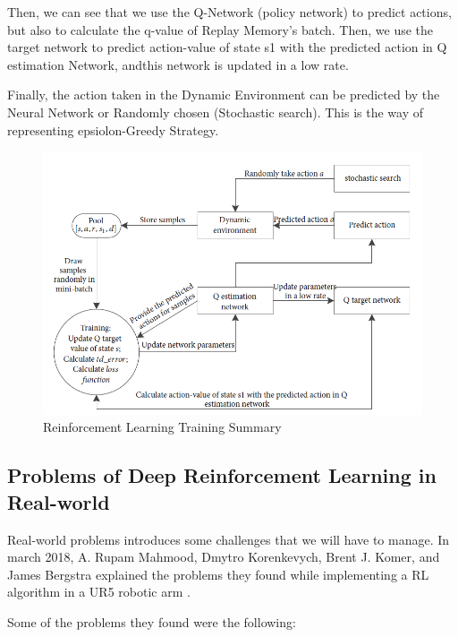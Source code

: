 			Then, we can see that we use the Q-Network (policy network) to predict actions, but also to calculate the q-value of Replay Memory's batch. Then, we use the target network to predict action-value of state s1 with the predicted action in Q estimation Network, andthis network is updated in a low rate.
			
			Finally, the action taken in the Dynamic Environment can be predicted by the Neural Network or Randomly chosen (Stochastic search). This is the way of representing epsiolon-Greedy Strategy. 
			
			\begin{figure}
				\centering
				\includegraphics[width=0.7\linewidth]{Images/Training}
				\caption[RL Training]{Reinforcement Learning Training Summary}
				\label{fig:training}
			\end{figure}
				
			
		
		
	\subsection{Problems of Deep Reinforcement Learning in Real-world}
		
		Real-world problems introduces some challenges that we will have to manage. In march 2018, A. Rupam Mahmood, Dmytro Korenkevych, Brent J. Komer, and James Bergstra explained the problems they found while implementing a RL algorithm in a UR5 robotic arm \cite{mahmood_setting_2018}.
		
		Some of the problems they found were the following:
		
